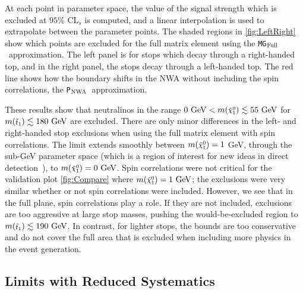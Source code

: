 \documentclass[a4paper,12pt]{article}
\newcommand{\gev}{~\text{GeV}}
\newcommand{\pythia}{\texttt{P}$_{\rm{NWA}}$}
\newcommand{\mg}{\texttt{MG}$_{\rm{Full}}$}
\def\mnino{\ensuremath{m({\footnotesize \ninoone})}}
\def\mstop{\ensuremath{m({\footnotesize \stopone})}}
\def\stopone{\ensuremath{\mathchoice%
      {\displaystyle\raise.0ex\hbox{$\displaystyle\tilde t_1$}}%
         {\textstyle\raise-.2ex\hbox{$\textstyle\tilde t_1$}}%
       {\scriptstyle\raise.0ex\hbox{$\scriptstyle\tilde t_1$}}%
 {\scriptscriptstyle\raise.0ex\hbox{$\scriptscriptstyle\tilde t_1$}}}}
\def\ninoone{\ensuremath{\mathchoice%
      {\displaystyle\raise.4ex\hbox{$\displaystyle\tilde\chi^0_1$}}%
         {\textstyle\raise.1ex\hbox{$\textstyle\tilde\chi^0_1$}}%
       {\scriptstyle\raise.3ex\hbox{$\scriptstyle\tilde\chi^0_1$}}%
 {\scriptscriptstyle\raise.3ex\hbox{$\scriptscriptstyle\tilde\chi^0_1$}}}}
\begin{document}
At each point in parameter space, the value of the signal strength which is excluded at $95\%$ CL$_s$ is computed, and a linear interpolation is used to extrapolate between the parameter points.  The shaded regions in \cref{fig:LeftRight} show which points are excluded for the full matrix element using the \mg\ approximation.  The left panel is for stops which decay through a right-handed top, and in the right panel, the stops decay through a left-handed top. The red line shows how the boundary shifts in the NWA without including the spin correlations, the \pythia\ approximation. 

These results show that neutralinos in the range $0 \gev< \mnino \lesssim 55\gev$ for $\mstop \lesssim 180\gev$ are excluded. There are only minor differences in the left- and right-handed stop exclusions when using the full matrix element with spin correlations. The limit extends smoothly between $\mnino = 1$ GeV, through the sub-GeV parameter space (which is a region of interest for new ideas in direct detection~\cite{Battaglieri:2017aum}), to $\mnino=0\gev$. Spin correlations were not critical for the validation plot \cref{fig:Compare} where $\mnino =  1 \gev$; the exclusions were very similar whether or not spin correlations were included. However, we see that in the full plane, spin correlations play a role. If they are not included, exclusions are too aggressive at large stop masses, pushing the would-be-excluded region to $\mstop \lesssim 190\gev$. In contrast, for lighter stops, the bounds are too conservative and do not cover the full area that is excluded when including more physics in the event generation.

\subsection{Limits with Reduced Systematics}
\label{sec:Systematics}
\end{document}
